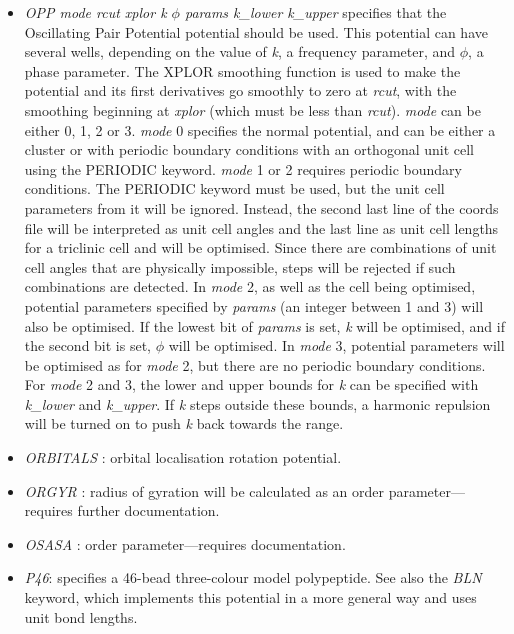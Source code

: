 \documentclass[12pt,a4paper,dvips]{article}
\begin{document}
\begin{itemize}
\item {\it OPP mode rcut xplor k $\phi$ params k\_lower k\_upper}
specifies that the Oscillating Pair Potential potential should be used. This potential can
have several wells, depending on the value of \textit{k}, a frequency parameter, and $\phi$, a phase parameter. 
The XPLOR smoothing function is used to make the potential and its first derivatives go smoothly to zero at {\it rcut}, with
the smoothing beginning at \textit{xplor} (which must be less than \textit{rcut}).
{\it mode} can be either 0, 1, 2 or 3. \textit{mode} 0 specifies the normal potential, and can be either a cluster or with periodic
boundary conditions with an orthogonal unit cell using the PERIODIC keyword. \textit{mode} 1 or 2 requires periodic boundary conditions.
The PERIODIC keyword must be used, but the unit cell parameters from it will be ignored. Instead, the second last line of the coords file
will be interpreted as unit cell angles and the last line as unit cell lengths for a triclinic cell and will be optimised. Since there
are combinations of unit cell angles that are physically impossible, steps will be rejected if such combinations are detected. In \textit{mode} 2, as
well as the cell being optimised, potential parameters specified by \textit{params} (an integer between 1 and 3)
will also be optimised. If the lowest bit of \textit{params} is set, \textit{k} will be optimised, and if the second bit is set, $\phi$ will be optimised.
In \textit{mode} 3, potential parameters will be optimised as for \textit{mode} 2, but there are no periodic boundary conditions.
For \textit{mode} 2 and 3, the lower and upper bounds for \textit{k} can be specified with \textit{k\_lower} and \textit{k\_upper}.
If \textit{k} steps outside these bounds, a harmonic repulsion will be turned on to push \textit{k} back towards the range.

\item {\it ORBITALS \/}: orbital localisation rotation potential.

\item {\it ORGYR \/}: radius of gyration will be calculated as an order parameter---requires 
further documentation.

\item {\it OSASA \/}: order parameter---requires documentation.

\item {\it P46\/}: specifies a 46-bead three-colour model polypeptide.
See also the {\it BLN} keyword, which implements this potential in a more
general way and uses unit bond lengths.


\end{itemize}
\end{document}
